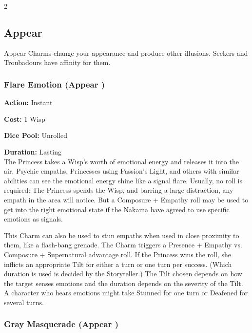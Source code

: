 \begin{multicols}{2}
\subsection*{Appear}
\label{subsec:Appear}

Appear Charms change your appearance and produce other illusions. Seekers and Troubadours have affinity for them. 

\subsubsection*{Flare Emotion (Appear \textbullet)}

\noindent \textbf{Action:} Instant 

\noindent \textbf{Cost:} 1 Wisp 

\noindent \textbf{Dice Pool:} Unrolled 

\noindent \textbf{Duration:} Lasting \\

\noindent The Princess takes a Wisp's worth of emotional energy and releases it into the air. Psychic empaths, Princesses using Passion’s Light, and others with similar abilities can see the emotional energy shine like a signal flare. Usually, no roll is required: The Princess spends the Wisp, and barring a large distraction, any empath in the area will notice. But a Composure + Empathy roll may be used to get into the right emotional state if the Nakama have agreed to use specific emotions as signals. 

This Charm can also be used to stun empaths when used in close proximity to them, like a flash-bang grenade. The Charm triggers a Presence + Empathy vs. Composure + Supernatural advantage roll. If the Princess wins the roll, she inflicts an appropriate Tilt for either a turn or one turn per success. (Which duration is used is decided by the Storyteller.) The Tilt chosen depends on how the target senses emotions and the duration depends on the severity of the Tilt. A character who hears emotions might take Stunned for one turn or Deafened for several turns. 


\subsubsection*{Gray Masquerade (Appear \textbullet)}


\end{multicols}
